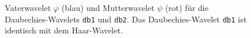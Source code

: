 \begin{figure}
\centering
{}
\caption{Vaterwavelet $\varphi$ (blau) und Mutterwavelet $\psi$
(rot) für die Daubechies-Wavelets \texttt{db1} und \texttt{db2}.
Das Daubechies-Wavelet \texttt{db1} ist identisch mit dem Haar-Wavelet.
\label{buch:algo:db1}}
\end{figure}%

